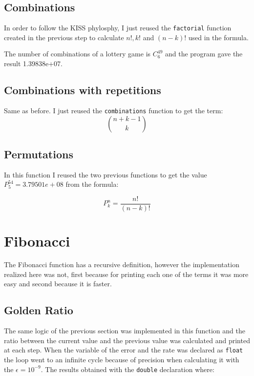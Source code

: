 \documentclass{article}
\begin{document}
\subsection{Combinations}
In order to follow the KISS phylosphy, I just reused the 
\verb+factorial+ function created in the previous step to calculate $n!, k!$
and $(n-k)!$ used in the formula.

The number of combinations of a lottery game is $C^{49}_{6}$ and 
the program gave the result 1.39838e+07.

\subsection{Combinations with repetitions}
Same as before. I just reused the \verb+combinations+ function to get
the term:
\begin{equation*}
\binom{n+k-1}{k}
\end{equation*} 

\subsection{Permutations}
In this function I reused the two previous functions to 
get the value $P_5^{54} = 3.79501e+08$ from
the formula:

\begin{equation*}
P_k^n = \frac{n!}{(n-k)!} 
\end{equation*} 


\section{Fibonacci}
\label{sec:fibo}
The Fibonacci function has a recursive definition, however the implementation
realized here was not, first because for printing each one of the terms it was 
more easy and second because it is faster.

\subsection{Golden Ratio}
The same logic of the previous section was implemented in this function and the
ratio between the current value and the previous value was calculated and printed
at each step. When the variable of the error and the rate was declared as \verb+float+
the loop went to an infinite cycle because of precision \cite{yohan1} when calculating it with
the $\epsilon = 10^{-9}$. The results obtained with the \verb+double+ declaration where:
\end{document}
